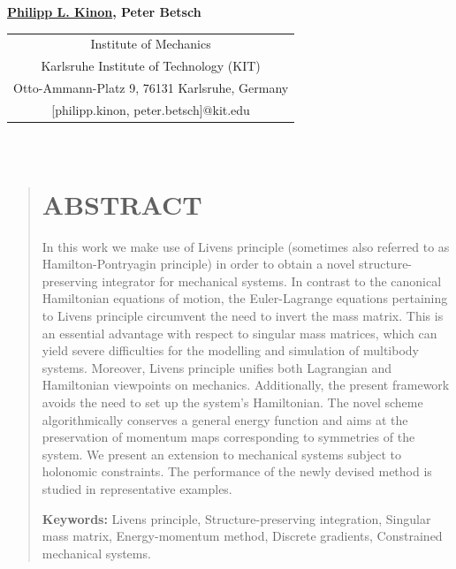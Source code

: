 \documentclass{multibody2023_full_paper}
\begin{document}
\begin{center}
\end{center}

\begin{center}
    \normalsize{
        \bf{
            \underline{Philipp L. Kinon},
            Peter Betsch}
    }
\end{center}

\begin{center}
    \begin{tabular}{c}
        Institute of Mechanics                        \\
        Karlsruhe Institute of Technology (KIT)       \\
        Otto-Ammann-Platz 9, 76131 Karlsruhe, Germany \\
        {[philipp.kinon, peter.betsch]@kit.edu  }     \\
    \end{tabular} \\
\end{center}


\begin{quote} %

    \section*{ABSTRACT}
    In this work we make use of Livens principle (sometimes also referred to as Hamilton-Pontryagin principle) in order to obtain a novel structure-preserving integrator for mechanical systems. In contrast to the canonical Hamiltonian equations of motion, the Euler-Lagrange equations pertaining to Livens principle circumvent the need to invert the mass matrix. This is an essential advantage with respect to singular mass matrices, which can yield severe difficulties for the modelling and simulation of multibody systems. Moreover, Livens principle unifies both Lagrangian and Hamiltonian viewpoints on mechanics. Additionally, the present framework avoids the need to set up the system's Hamiltonian. The novel scheme algorithmically conserves a general energy function and aims at the preservation of momentum maps corresponding to symmetries of the system. We present an extension to mechanical systems subject to holonomic constraints. The performance of the newly devised method is studied in representative examples.

    \textbf{Keywords:} Livens principle, Structure-preserving integration, Singular mass matrix, Energy-momentum method, Discrete gradients, Constrained mechanical systems.

\end{quote}
\end{document}
